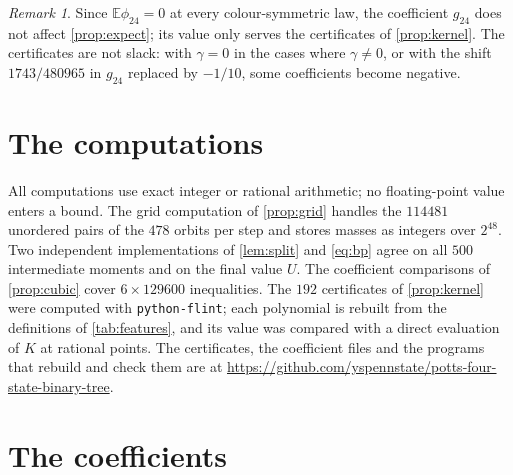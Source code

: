 \documentclass[11pt]{amsart}
\theoremstyle{definition}
\theoremstyle{remark}
\newtheorem{remark}[theorem]{Remark}
\newcommand{\E}{\mathbb{E}}
\begin{document}
\begin{remark}
Since $\E\phi_{24}=0$ at every colour-symmetric law, the coefficient $g_{24}$ does not affect
\cref{prop:expect}; its value only serves the certificates of \cref{prop:kernel}. The certificates are
not slack: with $\gamma=0$ in the cases where $\gamma\ne0$, or with the shift $1743/480965$ in $g_{24}$ replaced by $-1/10$, some
coefficients become negative.
\end{remark}

\section{The computations}\label{sec:computations}

All computations use exact integer or rational arithmetic; no floating-point value enters a bound.
The grid computation of \cref{prop:grid} handles the $114481$ unordered pairs of the $478$ orbits per
step and stores masses as integers over $2^{48}$. Two independent implementations of
\cref{lem:split} and \eqref{eq:bp} agree on all $500$ intermediate moments and on the final value $U$.
The coefficient comparisons of \cref{prop:cubic} cover $6\times129600$ inequalities. The $192$
certificates of \cref{prop:kernel} were computed with \texttt{python-flint}; each polynomial is rebuilt
from the definitions of \cref{tab:features}, and its value was compared with a direct evaluation of $K$
at rational points. The certificates, the coefficient files and the programs that rebuild and check them
are at \url{https://github.com/yspennstate/potts-four-state-binary-tree}.

\appendix
\section{The coefficients}\label{app:coeff}
\end{document}
